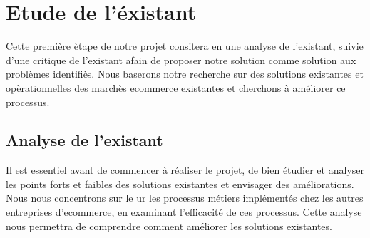 \section{Etude de l'éxistant}
\noindent
Cette première ètape de notre projet consitera en une analyse de l'existant, suivie d'une critique de l'existant afain de proposer notre solution comme solution aux problèmes identifiès. Nous baserons notre recherche sur des solutions existantes et opèrationnelles des marchès ecommerce existantes et cherchons à améliorer ce processus.

\subsection{Analyse de l'existant}
\noindent
Il est essentiel avant de commencer à réaliser le projet, de bien étudier et analyser les points forts et faibles des solutions existantes et envisager des améliorations. Nous nous concentrons sur le ur les processus métiers implémentés chez les autres entreprises d'ecommerce, en examinant l'efficacité de ces processus. Cette analyse nous permettra de comprendre comment améliorer les solutions existantes.

